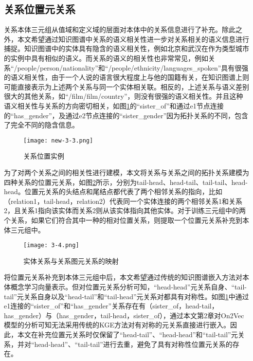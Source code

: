 \subsection{关系位置元关系}
关系本体三元组从值域和定义域的层面对本体中的关系信息进行了补充。除此之外，本文希望通过知识图谱中关系的语义相关性进一步对关系相关的语义信息进行捕捉。知识图谱中的实体具有隐含的语义相关性，例如北京和武汉在作为类型城市的实例中具有相似的语义。而关系的语义的相关性也非常常见，例如关系“/people/person/nationality”和“/people/ethnicity/languages\_spoken”具有很强的语义相关性，由于一个人说的语言很大程度上与他的国籍有关，在知识图谱上则可能直接表示为上述两个关系与同一个实体相关联。相反的，上述关系与语义差别很大的其他关系，如“/film/film/country”，则没有很强的语义相关性。并且这种语义相关性与关系的方向密切相关，如图\ref{fig:new-3-3}的“sister\_of”和通过e1节点连接的“has\_gender”，及通过e2节点连接的“sister\_gender”因为拓扑关系的不同，包含了完全不同的隐含信息。
\begin{figure}[h]
  \centering
  \texttt{[image: new-3-3.png]}
  \caption{关系位置实例}
  \label{fig:new-3-3}
\end{figure}

为了对两个关系之间的相关性进行建模，本文将关系与关系之间的拓扑关系建模为四种关系的位置元关系，如图\ref{fig:3-4}所示，分别为tail-head、head-tail、tail-tail、head-head。位置元关系的头结点和尾结点都代表了两个相邻关系的指向，比如（relation1，tail-head，relation2）代表同一个实体连接的两个相邻关系1和关系2，且关系1指向该实体而关系2则从该实体指向其他实体。对于训练三元组中的两个关系，如果它们符合其中一种的相对位置关系，则提取一个位置元关系补充到本体三元组中。
\begin{figure}[h]
  \centering
  \texttt{[image: 3-4.png]}
  \caption{实体关系与关系图元关系的映射}
  \label{fig:3-4}
\end{figure}

将位置元关系补充到本体三元组中后，本文希望通过传统的知识图谱嵌入方法对本体概念学习向量表示。但对位置元关系分析可知，“head-head”元关系自身、“tail-tail”元关系自身以及“head-tail”和“tail-head”元关系对都具有对称性。如图\ref{fig:new-3-3}中通过e1连接的“sister\_of”和“has\_gender”关系存在有（sister\_of，head-tail，has\_gender）与（has\_gender，tail-head，sister\_of），通过本文第2章对On2Vec模型的分析可知无法采用传统的KGE方法对有对称的元关系直接进行嵌入。因此，本文在补充位置元关系时仅保留了“head-tail”、“head-head”和“tail-tail”元关系，并对“head-head”、“tail-tail”进行去重，避免了具有对称性位置元关系的存在。

